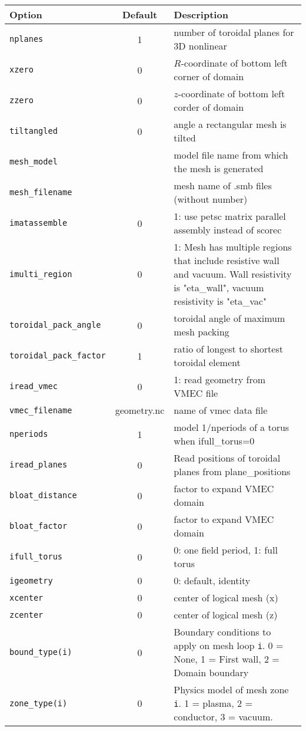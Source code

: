 \begin{tabular}{lcp{4.0in}}
  \textbf{Option} & \textbf{Default} & \textbf{Description}\\
  \hline
  \texttt{nplanes}& 1 & number of toroidal planes for 3D nonlinear \\
  \texttt{xzero}  & 0 & $R$-coordinate of bottom left corner of domain\\
  \texttt{zzero}  & 0 & $z$-coordinate of bottom left corder of domain\\
  \texttt{tiltangled} & 0 & angle a rectangular mesh is tilted \\
  \texttt{mesh\_model}&   & model file name from which the mesh is generated \\
  \texttt{mesh\_filename} & & mesh name of .smb files (without number) \\
  \texttt{imatassemble}  & 0 & 1: use petsc matrix parallel assembly instead of scorec \\
  \texttt{imulti\_region} & 0 & 1: Mesh has multiple regions that include resistive wall and
                               vacuum.   Wall resistivity is "eta\_wall", vacuum
                               resistivity is "eta\_vac"  \\
  \texttt{toroidal\_pack\_angle} & 0 & toroidal angle of maximum mesh packing \\
  \texttt{toroidal\_pack\_factor} & 1 & ratio of longest to shortest toroidal element \\

  \texttt{iread\_vmec}    & 0 & 1: read geometry from VMEC file \\
  \texttt{vmec\_filename} & geometry.nc& name of vmec data file \\
  \texttt{nperiods} & 1 & model 1/nperiods of a torus when ifull\_torus=0 \\
  \texttt{iread\_planes} & 0 & Read positions of toroidal planes from plane\_positions \\
  \texttt{bloat\_distance} & 0 & factor to expand VMEC domain \\
  \texttt{bloat\_factor}   & 0 & factor to expand VMEC domain \\
  \texttt{ifull\_torus}    & 0 & 0: one field period, 1: full torus \\
  \texttt{igeometry}       & 0 & 0: default, identity \\
  \texttt{xcenter}         & 0 & center of logical mesh (x) \\
  \texttt{zcenter}         & 0 & center of logical mesh (z) \\
  \texttt{bound\_type(i)}   & 0 & Boundary conditions to apply on mesh loop \texttt{i}.  0 = None, 1 = First wall, 2 = Domain boundary\\
  \texttt{zone\_type(i)}    & 0 & Physics model of mesh zone \texttt{i}.  1 = plasma, 2 = conductor, 3 = vacuum.\\
\end{tabular}

